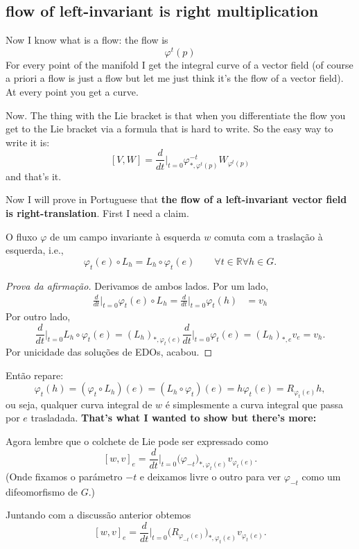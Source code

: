 \subsection*{flow of left-invariant is right multiplication}

Now I know what is a flow: the flow is
\[\varphi^t(p)\]
For every point of the manifold I get the integral curve of a vector field (of course a priori a flow is just a flow but let me just think it's the flow of a vector field). At every point you get a curve.

Now. The thing with the Lie bracket is that when you differentiate the flow you get to the Lie bracket via a formula that is hard to write. So the easy way to write it is:
\[[V,W]=\frac{d}{dt}\Big|_{t=0} \varphi^{-t}_{*,\varphi^t(p)}W_{\varphi^t(p)}\]
and that's it.

Now I will prove in Portuguese that \textbf{the flow of a left-invariant vector field is right-translation}. First I need a claim.

	\begin{claim}\leavevmode
	O fluxo \(\varphi\) de um campo invariante à esquerda \(w\) comuta com a traslação à esquerda, i.e.,
	\[\varphi_t(e)\circ L_h = L_h \circ \varphi_t(e)\qquad \forall t\in \mathbb{R} \forall h \in G.\]
	\end{claim}
	\begin{proof}[Prova da afirmação]\leavevmode
Derivamos de ambos lados. Por um lado,
\begin{align*}
\frac{d}{dt}\Big|_{t=0}\varphi_t(e) \circ L_h=\frac{d}{dt}\Big|_{t=0}\varphi_t(h)&=v_h\end{align*}
Por outro lado,
\[\frac{d}{dt}\Big|_{t=0}L_h \circ \varphi_t(e)=(L_h)_{*,\varphi_t(e)}\frac{d}{dt}\Big|_{t=0}\varphi_t(e)=(L_h)_{*,e}v_e=v_h.\]
Por unicidade das soluções de EDOs, acabou.
	\end{proof}
Então repare:
\[\varphi_t(h)=(\varphi_t\circ L_h)(e)=(L_h \circ \varphi_t)(e)=h\varphi_t(e)=R_{\varphi_t(e)}h,\]
ou seja, qualquer curva integral de \(w\) é simplesmente a curva integral que passa por \(e\) trasladada. \textbf{That's what I wanted to show but there's more:} 

Agora lembre que o colchete de Lie pode ser expressado como
\[[w,v]_e=\frac{d}{dt}\Big|_{t=0}\Big(\varphi_{-t}\Big)_{*,\varphi_t(e)}v_{\varphi_t(e)}.\]
(Onde fixamos o parámetro \(-t\) e deixamos livre o outro para ver \(\varphi_{-t}\) como um difeomorfismo de \(G\).)

Juntando com a discussão anterior obtemos
\[[w,v]_e=\frac{d}{dt}\Big|_{t=0}\Big(R_{\varphi_{-t}(e)}\Big)_{*,\varphi_t(e)}v_{\varphi_t(e)}.\]


